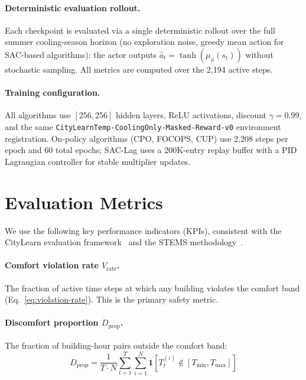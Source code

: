 \paragraph{Deterministic evaluation rollout.}
Each checkpoint is evaluated via a single deterministic rollout over the full
summer cooling-season horizon
(no exploration noise, greedy mean action for SAC-based algorithms): the
actor outputs $\hat{a}_t = \tanh(\mu_\phi(s_t))$ without stochastic sampling.
All metrics are computed over the 2{,}194 active steps.

\paragraph{Training configuration.}
All algorithms use $[256, 256]$ hidden layers, ReLU activations, discount
$\gamma = 0.99$, and the same \texttt{CityLearnTemp-CoolingOnly-Masked-Reward-v0}
environment registration.  On-policy algorithms (CPO, FOCOPS, CUP) use
2{,}208 steps per epoch and 60 total epochs; SAC-Lag uses a 200K-entry replay
buffer with a PID Lagrangian controller for stable multiplier updates.


\section{Evaluation Metrics}
\label{sec:temp-metrics}

We use the following key performance indicators (KPIs), consistent with the
CityLearn evaluation framework~\cite{nweye2023citylearn} and the STEMS
methodology~\cite{zhang2025stems}.

\paragraph{Comfort violation rate $V_{\text{rate}}$.}
The fraction of active time steps at which any building violates the comfort
band (Eq.~\ref{eq:violation-rate}).  This is the primary safety metric.

\paragraph{Discomfort proportion $D_{\text{prop}}$.}
The fraction of building-hour pairs outside the comfort band:
\begin{equation}
  D_{\text{prop}} = \frac{1}{T \cdot N}
    \sum_{t=1}^{T} \sum_{i=1}^{N}
    \mathbf{1}\!\left[T_{t}^{(i)} \notin [T_{\min}, T_{\max}]\right]
  \label{eq:discomfort-proportion}
\end{equation}

